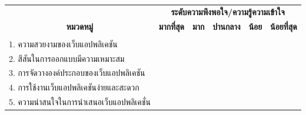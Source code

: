 \documentclass[12pt,oneside,openright,a4paper]{cpe-thai-project}
\begin{document}
    \begin{longtable}{|lcclll|}
      \hline
      \multicolumn{1}{|c|}{} &
        \multicolumn{5}{c|}{\textbf{ระดับความพึงพอใจ/ความรู้ความเข้าใจ}} \\ \cline{2-6} 
      \multicolumn{1}{|c|}{\multirow{-2}{*}{\textbf{หมวดหมู่}}} &
        \multicolumn{1}{c|}{\textbf{มากที่สุด}} &
        \multicolumn{1}{c|}{\textbf{มาก}} &
        \multicolumn{1}{c|}{\textbf{ปานกลาง}} &
        \multicolumn{1}{c|}{\textbf{น้อย}} &
        \multicolumn{1}{c|}{\textbf{น้อยที่สุด}} \\ \hline
      \endhead
      \multicolumn{6}{|l|}{\cellcolor[HTML]{000000}{\color[HTML]{FFFFFF} \textbf{ด้านการออกแบบ}}} \\ \hline
      \multicolumn{1}{|l|}{1. ความสวยงามของเว็บแอปพลิเคชัน} &
        \multicolumn{1}{c|}{} &
        \multicolumn{1}{c|}{} &
        \multicolumn{1}{l|}{} &
        \multicolumn{1}{l|}{} &
         \\ \hline
      \multicolumn{1}{|l|}{2. สีสันในการออกแบบมีความเหมาะสม} &
        \multicolumn{1}{c|}{} &
        \multicolumn{1}{c|}{} &
        \multicolumn{1}{l|}{} &
        \multicolumn{1}{l|}{} &
         \\ \hline
      \multicolumn{1}{|l|}{3. การจัดวางองค์ประกอบของเว็บแอปพลิเคชัน} &
        \multicolumn{1}{c|}{} &
        \multicolumn{1}{c|}{} &
        \multicolumn{1}{l|}{} &
        \multicolumn{1}{l|}{} &
         \\ \hline
      \multicolumn{1}{|l|}{4. การใช้งานเว็บแอปพลิเคชันง่ายและสะดวก} &
        \multicolumn{1}{c|}{} &
        \multicolumn{1}{c|}{} &
        \multicolumn{1}{l|}{} &
        \multicolumn{1}{l|}{} &
         \\ \hline
      \multicolumn{1}{|l|}{5. ความน่าสนใจในการนำเสนอเว็บแอปพลิเคชั่น} &
        \multicolumn{1}{c|}{} &
        \multicolumn{1}{c|}{} &

\end{longtable}
\end{document}
